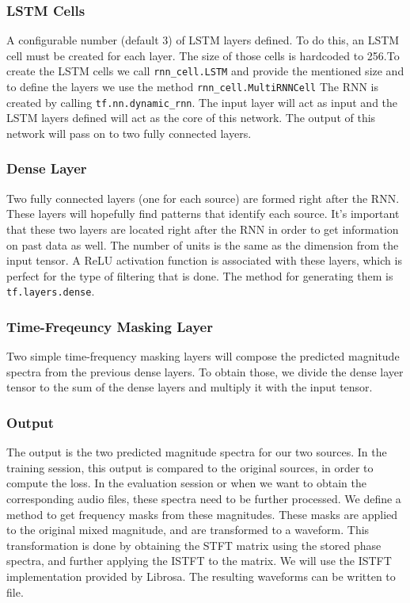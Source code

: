 \documentclass[../Thesis.tex]{subfiles}
\begin{document}
\subsubsection {LSTM Cells}

A configurable number (default 3) of LSTM layers defined. To do this, an LSTM cell must be created for each layer. The size of those cells is hardcoded to 256.To create the LSTM cells we call \texttt{rnn\_cell.LSTM} and provide the mentioned size and to define the layers we use the method \texttt{rnn\_cell.MultiRNNCell} The RNN is created by calling \texttt{tf.nn.dynamic\_rnn}. The input layer will act as input and the LSTM layers defined will act as the core of this network. The output of this network will pass on to two fully connected layers.

\subsubsection {Dense Layer}

Two fully connected layers (one for each source) are formed right after the RNN. These layers will hopefully find patterns that identify each source. It’s important that these two layers are located right after the RNN in order to get information on past data as well.  The number of units is the same as the dimension from the input tensor. A ReLU activation function is associated with these layers, which is perfect for the type of filtering that is done. The method for generating them is \texttt{tf.layers.dense}.


\subsubsection {Time-Freqeuncy Masking Layer}

Two simple time-frequency masking layers will compose the predicted magnitude spectra from the previous dense layers. To obtain those, we divide the dense layer tensor to the sum of the dense layers and multiply it with the input tensor.


\subsubsection {Output}

The output is the two predicted magnitude spectra for our two sources. In the training session, this output is compared to the original sources, in order to compute the loss. In the evaluation session or when we want to obtain the corresponding audio files, these spectra need to be further processed. We define a method to get frequency masks from these magnitudes. These masks are applied to the original mixed magnitude, and are transformed to a waveform. This transformation is done by obtaining the STFT matrix using the stored phase spectra, and further applying the ISTFT to the matrix. We will use the ISTFT implementation provided by Librosa. The resulting waveforms can be written to file.
\end{document}
